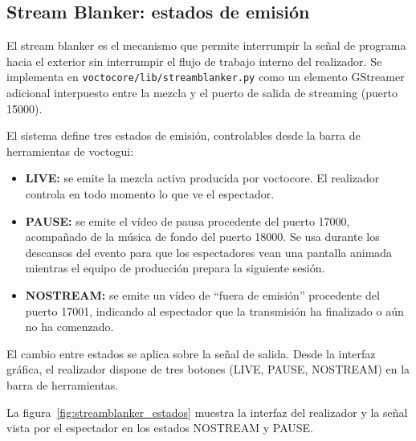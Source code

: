 \subsection{Stream Blanker: estados de emisión}

El stream blanker es el mecanismo que permite interrumpir la señal de programa hacia el
exterior sin interrumpir el flujo de trabajo interno del realizador. Se implementa en
\texttt{voctocore/lib/streamblanker.py} como un elemento GStreamer adicional interpuesto
entre la mezcla y el puerto de salida de streaming (puerto 15000).

El sistema define tres estados de emisión, controlables desde la barra de herramientas
de voctogui:

\begin{itemize}
  \item \textbf{LIVE:} se emite la mezcla activa producida por voctocore. El realizador
        controla en todo momento lo que ve el espectador.
  \item \textbf{PAUSE:} se emite el vídeo de pausa procedente del puerto 17000,
        acompañado de la música de fondo del puerto 18000.
        Se usa durante los descansos del evento para que los espectadores vean una pantalla
        animada mientras el equipo de producción prepara la siguiente sesión.
  \item \textbf{NOSTREAM:} se emite un vídeo de ``fuera de emisión'' procedente del
        puerto 17001, indicando al espectador
        que la transmisión ha finalizado o aún no ha comenzado.
\end{itemize}

El cambio entre estados se aplica sobre la señal de salida.
Desde la interfaz gráfica, el realizador dispone de tres botones (LIVE, PAUSE,
NOSTREAM) en la barra de herramientas.

La figura~\ref{fig:streamblanker_estados} muestra la interfaz del realizador y la
señal vista por el espectador en los estados NOSTREAM y PAUSE.

